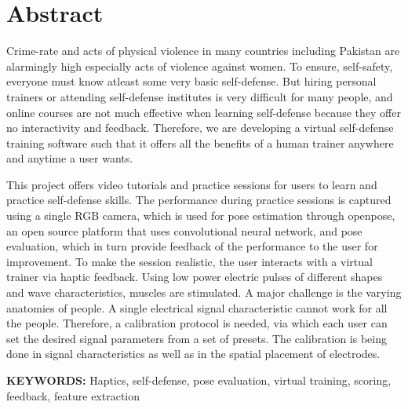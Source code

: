 \documentclass[12pt,twosided]{report}
\begin{document}



\chapter*{Abstract}
Crime-rate and acts of physical violence in many countries including Pakistan are alarmingly high especially acts of violence against women. To ensure, self-safety, everyone must know atleast some very basic self-defense. But hiring personal trainers or attending self-defense institutes is very difficult for many people, and online courses are not much effective when learning self-defense because they offer no interactivity and feedback. Therefore, we are developing a virtual self-defense training software such that it offers all the benefits of a human trainer anywhere and anytime a user wants. 

This project offers video tutorials and practice sessions for users to learn and practice self-defense skills. The performance during practice sessions is captured using a single RGB camera, which is used for pose estimation through openpose, an open source platform that uses convolutional neural network, and pose evaluation, which in turn provide feedback of the performance to the user for improvement. To make the session realistic, the user interacts with a virtual trainer via haptic feedback. Using low power electric pulses of different shapes and wave characteristics, muscles are stimulated. A major challenge is the varying anatomies of people. A single electrical signal characteristic cannot work for all the people. Therefore, a calibration protocol is needed, via which each user can set the desired signal parameters from a set of presets. The calibration is being done in signal characteristics as well as in the spatial placement of electrodes.

\begin{flushleft}
\textbf{KEYWORDS:} Haptics, self-defense, pose evaluation, virtual training, scoring, feedback, feature extraction
\end{flushleft}
\tableofcontents
\listoffigures
\listoftables
\end{document}
